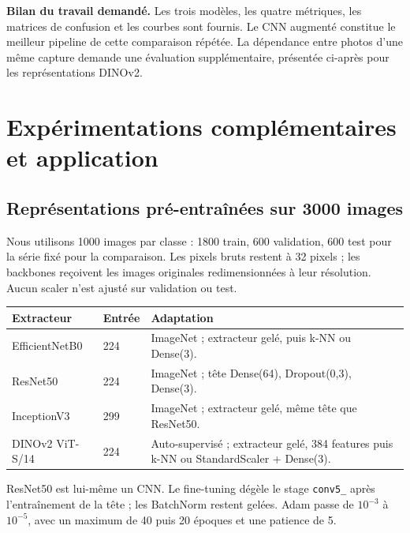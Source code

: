 \documentclass[10pt,a4paper]{article}
\begin{document}
\textbf{Bilan du travail demandé.} Les trois modèles, les quatre métriques, les matrices de
confusion et les courbes sont fournis. Le CNN augmenté constitue le meilleur pipeline de
cette comparaison répétée. La dépendance entre photos d'une même capture demande une
évaluation supplémentaire, présentée ci-après pour les représentations DINOv2.

\clearpage
\section{Expérimentations complémentaires et application}
\subsection{Représentations pré-entraînées sur 3000 images}
Nous utilisons 1000 images par classe : 1800 train, 600 validation, 600 test pour la série
fixé pour la comparaison. Les pixels bruts restent à 32 pixels ; les backbones reçoivent les images originales
redimensionnées à leur résolution. Aucun scaler n'est ajusté sur validation ou test.
\begin{center}\small
\begin{tabular}{llp{9.2cm}}\toprule
Extracteur & Entrée & Adaptation\\\midrule
EfficientNetB0 & 224 & ImageNet ; extracteur gelé, puis k-NN ou Dense(3).\\
ResNet50 & 224 & ImageNet ; tête Dense(64), Dropout(0,3), Dense(3).\\
InceptionV3 & 299 & ImageNet ; extracteur gelé, même tête que ResNet50.\\
DINOv2 ViT-S/14 & 224 & Auto-supervisé ; extracteur gelé, 384 features puis k-NN ou StandardScaler + Dense(3).\\\bottomrule\end{tabular}
\end{center}
ResNet50 est lui-même un CNN. Le fine-tuning dégèle le stage \texttt{conv5\_} après l'entraînement
de la tête ; les BatchNorm restent gelées. Adam passe de $10^{-3}$ à $10^{-5}$, avec un maximum
de 40 puis 20 époques et une patience de 5.
\end{document}
